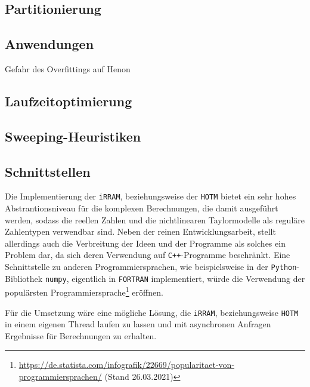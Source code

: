 \subsection{Partitionierung}


\subsection{Anwendungen}
Gefahr des Overfittings auf Henon




\subsection{Laufzeitoptimierung}

\subsection{Sweeping-Heuristiken}

\subsection{Schnittstellen}
Die Implementierung der \verb+iRRAM+, beziehungsweise der \verb+HOTM+ bietet ein sehr hohes Abstrantionsniveau für die komplexen Berechnungen, die damit ausgeführt werden, sodass die reellen Zahlen und die nichtlinearen Taylormodelle als reguläre Zahlentypen verwendbar sind. Neben der reinen Entwicklungsarbeit, stellt allerdings auch die Verbreitung der Ideen und der Programme als solches ein Problem dar, da sich deren Verwendung auf \verb.C++.-Programme beschränkt. Eine Schnittstelle zu anderen Programmiersprachen, wie beispielsweise in der \verb+Python+-Bibliothek \verb+numpy+, eigentlich in \verb+FORTRAN+ implementiert, würde die Verwendung der populärsten Programmiersprache\footnote{\url{https://de.statista.com/infografik/22669/popularitaet-von-programmiersprachen/} (Stand 26.03.2021)} eröffnen.


Für die Umsetzung wäre eine mögliche Lösung, die \verb+iRRAM+, beziehungsweise \verb+HOTM+ in einem eigenen Thread laufen zu lassen und mit asynchronen Anfragen Ergebnisse für Berechnungen zu erhalten.

